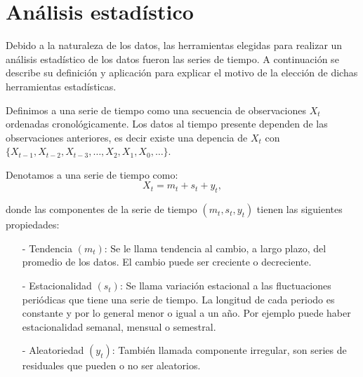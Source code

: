 \chapter{Análisis estadístico}



Debido a la naturaleza de los datos, las herramientas elegidas para realizar un análisis estadístico de los datos fueron las series de tiempo. A continuación se describe su definición y aplicación para explicar el motivo de la elección de dichas herramientas estadísticas.

Definimos a una serie de tiempo como una secuencia de observaciones $X_{t}$ ordenadas cronológicamente. Los datos al tiempo presente dependen de las observaciones anteriores, es decir existe una depencia de $X_{t}$ con $\{X_{t-1}, X_{t-2}, X_{t-3}, \ldots, X_{2}, X_{1}, X_{0}, \ldots\}$.

Denotamos a una serie de tiempo como:
  \begin{equation}
X_{t} = m_{t} + s_{t} + y_{t},
\end{equation}

donde las componentes de la serie de tiempo $(m_{t}, s_{t}, y_{t})$ tienen las siguientes propiedades:

\begin{itemize}
\item[-] Tendencia $(m_{t})$: Se le llama tendencia al cambio, a largo plazo, del promedio de los datos. El cambio puede ser creciente o decreciente.

\item[-] Estacionalidad $(s_{t})$: Se llama variación estacional a las fluctuaciones periódicas que tiene una serie de tiempo. La longitud de cada periodo es constante y por lo general menor o igual a un año. Por ejemplo puede haber estacionalidad semanal, mensual o semestral.

\item[-] Aleatoriedad $(y_{t})$: También llamada componente irregular, son series de residuales que pueden o no ser aleatorios.
\end{itemize}

